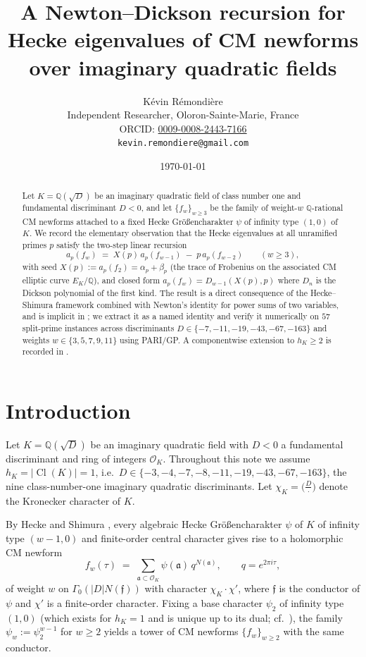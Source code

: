 \documentclass[11pt]{amsart}
\title[Newton--Dickson recursion for CM newforms]{A Newton--Dickson recursion for Hecke eigenvalues of
CM newforms over imaginary quadratic fields}
\author[K. R\'emondi\`ere]{K\'evin R\'emondi\`ere\\
\small Independent Researcher, Oloron-Sainte-Marie, France\\
\small ORCID: \href{https://orcid.org/0009-0008-2443-7166}{0009-0008-2443-7166}\\
\small \texttt{kevin.remondiere@gmail.com}}
\date{\today}
\theoremstyle{definition}
\theoremstyle{remark}
\DeclareMathOperator{\Cl}{Cl}
\newcommand{\Q}{\mathbb{Q}}
\newcommand{\OK}{\mathcal{O}_K}
\newcommand{\chiK}{\chi_K}
\newcommand{\fraka}{\mathfrak{a}}
\newcommand{\frakf}{\mathfrak{f}}
\begin{document}
\begin{abstract}
Let $K = \Q(\sqrt{D})$ be an imaginary quadratic field of class
number one and fundamental discriminant $D < 0$, and let
$\{f_w\}_{w \ge 3}$ be the family of weight-$w$ $\Q$-rational
CM newforms attached to a fixed Hecke Gr\"o\ss encharakter $\psi$ of
infinity type $(1,0)$ of $K$. We record the elementary observation
that the Hecke eigenvalues at all unramified primes $p$ satisfy the
two-step linear recursion
\[
  a_p(f_w) \;=\; X(p)\, a_p(f_{w-1}) \;-\; p\, a_p(f_{w-2})
  \qquad (w \ge 3),
\]
with seed $X(p) := a_p(f_2) = \alpha_p + \beta_p$ (the trace of
Frobenius on the associated CM elliptic curve $E_K/\Q$), and closed
form $a_p(f_w) = D_{w-1}(X(p), p)$ where $D_n$ is the Dickson
polynomial of the first kind. The result is a direct consequence of
the Hecke--Shimura framework combined with Newton's identity for
power sums of two variables, and is implicit in
\cite{Shimura1971,Hecke1936,Ribet1977}; we extract it as a named
identity and verify it numerically on $57$ split-prime instances
across discriminants $D \in \{-7, -11, -19, -43, -67, -163\}$ and
weights $w \in \{3,5,7,9,11\}$ using PARI/GP. A componentwise
extension to $h_K \ge 2$ is recorded in .
\end{abstract}

\maketitle

\section{Introduction}\label{sec:intro}

Let $K = \Q(\sqrt{D})$ be an imaginary quadratic field with $D < 0$
a fundamental discriminant and ring of integers $\OK$. Throughout
this note we assume $h_K = |\Cl(K)| = 1$, i.e.\ $D \in \{-3, -4, -7,
-8, -11, -19, -43, -67, -163\}$, the nine class-number-one imaginary
quadratic discriminants. Let $\chiK = \bigl(\tfrac{D}{\cdot}\bigr)$
denote the Kronecker character of $K$.

By Hecke \cite{Hecke1936} and Shimura
\cite[\S\S3.4, 7.6]{Shimura1971}, every algebraic Hecke
Gr\"o\ss encharakter $\psi$ of $K$ of infinity type $(w-1, 0)$ and
finite-order central character gives rise to a holomorphic CM
newform
\begin{equation}\label{eq:theta}
  f_w(\tau) \;=\; \sum_{\fraka \subset \OK} \psi(\fraka)\,
  q^{N(\fraka)}, \qquad q = e^{2\pi i \tau},
\end{equation}
of weight $w$ on $\Gamma_0(|D|N(\frakf))$ with character
$\chiK \cdot \chi'$, where $\frakf$ is the conductor of $\psi$ and
$\chi'$ is a finite-order character. Fixing a base character
$\psi_2$ of infinity type $(1, 0)$ (which exists for $h_K = 1$ and
is unique up to its dual; cf.\ \cite{Deuring1953}), the family
$\psi_w := \psi_2^{w-1}$ for $w \ge 2$ yields a tower of CM
newforms $\{f_w\}_{w \ge 2}$ with the same conductor.
\end{document}
